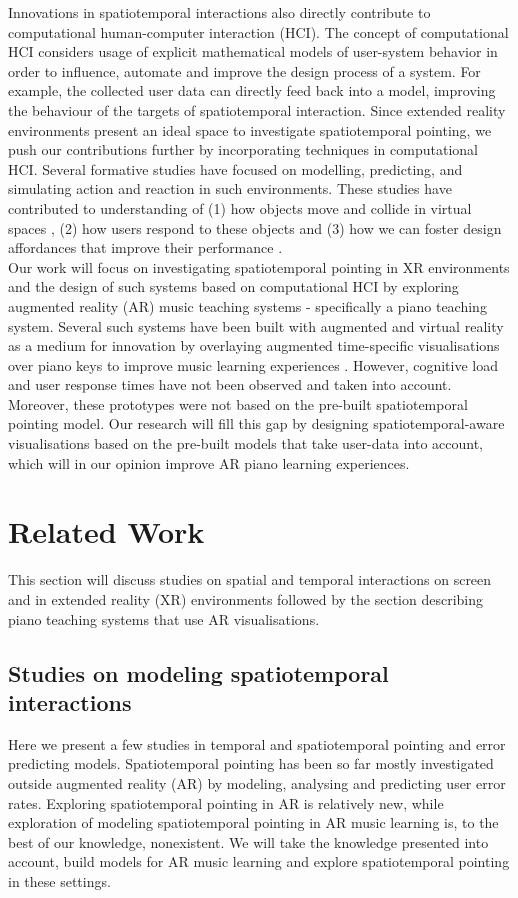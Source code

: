 \documentclass[manuscript,screen]{acmart}
\begin{document}
Innovations in spatiotemporal interactions also directly contribute to computational human-computer interaction (HCI). The concept of computational HCI considers usage of explicit mathematical models of user-system behavior in order to influence, automate and improve the design process of a system. For example, the collected user data can directly feed back into a model, improving the behaviour of the targets of spatiotemporal interaction. Since extended reality environments present an ideal space to investigate spatiotemporal pointing, we push our contributions further by incorporating techniques in computational HCI. Several formative studies have focused on modelling, predicting, and simulating action and reaction in such environments. These studies have contributed to understanding of (1) how objects move and collide in virtual spaces \cite{lee2017boxer}, (2) how users respond to these objects \cite{lee2016modelling} and (3) how we can foster design affordances that improve their performance \cite{rogers2014piano}.\\

Our work will focus on investigating spatiotemporal pointing in XR environments and the design of such systems based on computational HCI by exploring augmented reality (AR) music teaching systems - specifically a piano teaching system. Several such systems have been built with augmented and virtual reality as a medium for innovation by overlaying augmented time-specific visualisations over piano keys to improve music learning experiences \cite{rogers2014piano, sun2018mr, birhanu2017keynvision}. However, cognitive load and user response times have not been observed and taken into account. Moreover, these prototypes were not based on the pre-built spatiotemporal pointing model. Our research will fill this gap by designing spatiotemporal-aware visualisations based on the pre-built models that take user-data into account, which will in our opinion improve  AR piano learning experiences. 

\section{Related Work}
This section will discuss studies on spatial and temporal interactions on screen and in extended reality (XR) environments followed by the section describing piano teaching systems that use AR visualisations. 

\subsection{Studies on modeling spatiotemporal interactions}
Here we present a few studies in temporal and spatiotemporal pointing and error predicting models. Spatiotemporal pointing has been so far mostly investigated outside augmented reality (AR) by modeling, analysing and predicting user error rates. Exploring spatiotemporal pointing in AR is relatively new, while exploration of modeling spatiotemporal pointing in AR music learning is, to the best of our knowledge, nonexistent. We will take the knowledge presented into account, build models for AR music learning and explore spatiotemporal pointing in these settings. 
\end{document}
